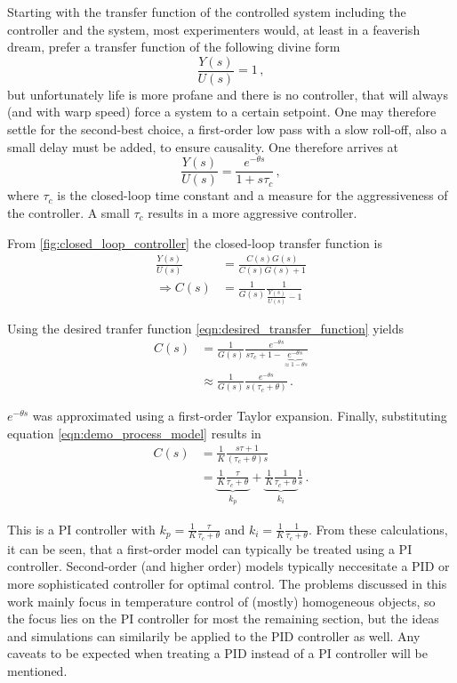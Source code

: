 Starting with the transfer function of the controlled system including the controller and the system, most experimenters would, at least in a feaverish dream, prefer a transfer function of the following divine form
\begin{equation*}
    \frac{Y(s)}{U(s)} = 1 \,,
\end{equation*}
but unfortunately life is more profane and there is no controller, that will always (and with warp speed) force a system to a certain setpoint. One may therefore settle for the second-best choice, a first-order low pass with a slow roll-off, also a small delay must be added, to ensure causality. One therefore arrives at
\begin{equation}
    \frac{Y(s)}{U(s)} = \frac{e^{-\theta s}}{1 + s \tau_c}\,, \label{eqn:desired_transfer_function}
\end{equation}
where $\tau_c$ is the closed-loop time constant and a measure for the aggressiveness of the controller. A small $\tau_c$ results in a more aggressive controller.

From \ref{fig:closed_loop_controller} the closed-loop transfer function is
\begin{align*}
    \frac{Y(s)}{U(s)} &= \frac{C(s) G(s)}{C(s) G(s) + 1} \\
    \Rightarrow C(s) &= \frac{1}{G(s)} \frac{1}{\frac{Y(s)}{U(s)} -1}
\end{align*}

Using the desired tranfer function \ref{eqn:desired_transfer_function} yields
\begin{align}
    C(s) &= \frac{1}{G(s)} \frac{e^{-\theta s}}{s \tau_c +1 - \underbrace{e^{-\theta s}}_{\approx 1 - \theta s}}\\
    &\approx \frac{1}{G(s)} \frac{e^{-\theta s}}{s (\tau_c + \theta)} \,.
\end{align}

$e^{-\theta s}$ was approximated using a first-order Taylor expansion. Finally, substituting equation \ref{eqn:demo_process_model} results in
\begin{align}
    C(s) &= \frac{1}{K} \frac{s \tau + 1}{(\tau_c + \theta) s} \nonumber\\
    &= \underbrace{\frac{1}{K} \frac{\tau}{\tau_c + \theta}}_{k_p} + \underbrace{\frac{1}{K} \frac{1}{\tau_c + \theta}}_{k_i} \frac{1}{s}\,.
\end{align}

This is a PI controller with $k_p = \frac{1}{K} \frac{\tau}{\tau_c + \theta}$ and $k_i = \frac{1}{K} \frac{1}{\tau_c + \theta}$. From these calculations, it can be seen, that a first-order model can typically be treated using a PI controller. Second-order (and higher order) models typically neccesitate a PID or more sophisticated controller for optimal control. The problems discussed in this work mainly focus in temperature control of (mostly) homogeneous objects, so the focus lies on the PI controller for most the remaining section, but the ideas and simulations can similarily be applied to the PID controller as well. Any caveats to be expected when treating a PID instead of a PI controller will be mentioned.

